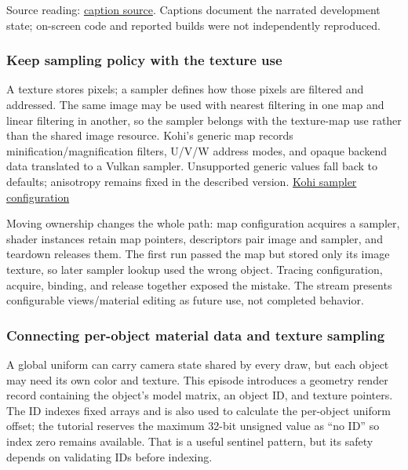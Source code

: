 Source reading: \href{https://www.youtube.com/watch?v=01KQiQ4fdXs}{caption source}. Captions document the narrated development state; on-screen code and reported builds were not independently reproduced.

\subsubsection{Keep sampling policy with the texture use}\label{06-engine-ii-ch025-keep-sampling-policy-with-the-texture-use}

A texture stores pixels; a sampler defines how those pixels are filtered and addressed. The same image may be used with nearest filtering in one map and linear filtering in another, so the sampler belongs with the texture-map use rather than the shared image resource. Kohi's generic map records minification/magnification filters, U/V/W address modes, and opaque backend data translated to a Vulkan sampler. Unsupported generic values fall back to defaults; anisotropy remains fixed in the described version. \href{https://www.youtube.com/watch?v=hGA2veSznn8}{Kohi sampler configuration}

Moving ownership changes the whole path: map configuration acquires a sampler, shader instances retain map pointers, descriptors pair image and sampler, and teardown releases them. The first run passed the map but stored only its image texture, so later sampler lookup used the wrong object. Tracing configuration, acquire, binding, and release together exposed the mistake. The stream presents configurable views/material editing as future use, not completed behavior.

\subsubsection{Connecting per-object material data and texture sampling}\label{06-engine-ii-ch025-connecting-per-object-material-data-and-texture-sampling}

A global uniform can carry camera state shared by every draw, but each object may need its own color and texture. This episode introduces a geometry render record containing the object's model matrix, an object ID, and texture pointers. The ID indexes fixed arrays and is also used to calculate the per-object uniform offset; the tutorial reserves the maximum 32-bit unsigned value as ``no ID'' so index zero remains available. That is a useful sentinel pattern, but its safety depends on validating IDs before indexing.

